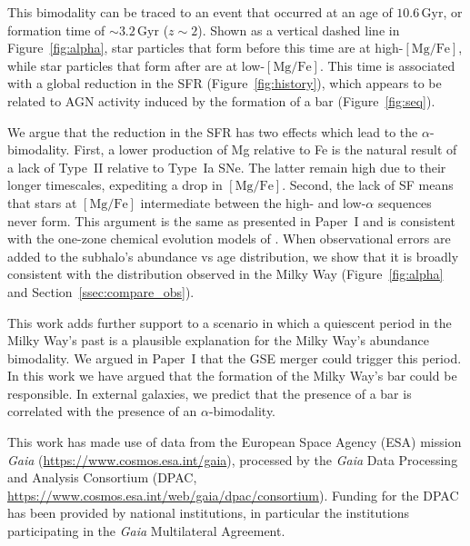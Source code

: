 \documentclass[twocolumn]{aastex631}
\newcommand{\Gyr}{\ensuremath{\textrm{Gyr}}}
\newcommand{\MgFe}{\ensuremath{[\textrm{Mg}/\textrm{Fe}]}}
\begin{document}
This bimodality can be traced to an event that occurred at an age of $10.6\,\Gyr$, or formation time of $\sim3.2\,\Gyr$ ($z\sim2$). Shown as a vertical dashed line in Figure~\ref{fig:alpha}, star particles that form before this time are at high-\MgFe{}, while star particles that form after are at low-\MgFe{}. This time is associated with a global reduction in the SFR (Figure~\ref{fig:history}), which appears to be related to AGN activity induced by the formation of a bar (Figure~\ref{fig:seq}).

We argue that the reduction in the SFR has two effects which lead to the $\alpha$-bimodality. First, a lower production of Mg relative to Fe is the natural result of a lack of Type~II relative to Type~Ia SNe. The latter remain high due to their longer timescales, expediting a drop in \MgFe{}. Second, the lack of SF means that stars at \MgFe{} intermediate between the high- and low-$\alpha$ sequences never form. This argument is the same as presented in Paper~I and is consistent with the one-zone chemical evolution models of \citet{2020MNRAS.498.1364J}. When observational errors are added to the subhalo's abundance vs age distribution, we show that it is broadly consistent with the distribution observed in the Milky Way (Figure~\ref{fig:alpha} and Section~\ref{ssec:compare_obs}).

This work adds further support to a scenario in which a quiescent period in the Milky Way's past is a plausible explanation for the Milky Way's abundance bimodality. We argued in Paper~I that the GSE merger could trigger this period. In this work we have argued that the formation of the Milky Way's bar could be responsible. In external galaxies, we predict that the presence of a bar is correlated with the presence of an $\alpha$-bimodality.

\begin{acknowledgements}
This work has made use of data from the European Space Agency (ESA) mission {\it Gaia} (\url{https://www.cosmos.esa.int/gaia}), processed by the {\it Gaia} Data Processing and Analysis Consortium (DPAC, \url{https://www.cosmos.esa.int/web/gaia/dpac/consortium}). Funding for the DPAC has been provided by national institutions, in particular the institutions participating in the {\it Gaia} Multilateral Agreement.
\end{acknowledgements}

{}


\appendix
\end{document}
